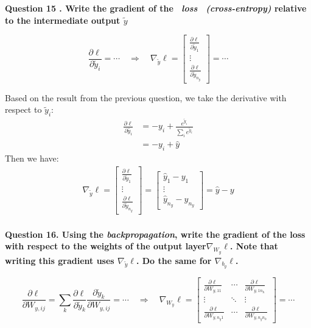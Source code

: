 \documentclass{article}
\begin{document}
\noindent \textbf{Question 15 . Write the gradient of the \ \textit{loss \ (cross-entropy)}  relative to the intermediate output \(\tilde{y}\)}

\[
\frac{\partial \ell}{\partial \tilde{y}_i} = \cdots \quad \Rightarrow \quad \nabla_{\tilde{y}} \ell = \begin{bmatrix} 
\frac{\partial \ell}{\partial \tilde{y}_1} \\
\vdots \\
\frac{\partial \ell}{\partial \tilde{y}_{n_y}} 
\end{bmatrix} = \cdots
\]

Based on the result from the previous question, we take the derivative with respect to \(\tilde{y}_i\):
\begin{align*}
    \frac{\partial \ell}{\partial \tilde{y_i}}
    &= -y_i+\frac{e^{\tilde{y}_i}}{\sum_i e^{\tilde{y}_i}}\\
    &= -y_i+\hat{y}
\end{align*}
Then we have:
\begin{align*}
    \nabla_{\tilde{y}}\ell
 =\begin{bmatrix} 
\frac{\partial \ell}{\partial \tilde{y}_1} \\
\vdots \\
\frac{\partial \ell}{\partial \tilde{y}_{n_y}} 
\end{bmatrix}
=\begin{bmatrix} 
\hat{y}_1-y_1 \\
\vdots \\
\hat{y}_{n_y}-y_{n_y} 
\end{bmatrix}
=\hat{y}-y
\end{align*}\\

\noindent \textbf{Question 16. Using the \textit{backpropagation}, write the gradient of the loss with respect to the weights of the output layer\(\nabla_{W_y} \ell\). Note that writing this gradient uses \(\nabla_{\tilde{y}} \ell\). Do the same for \(\nabla_{b_y} \ell\).}

\[
\frac{\partial \ell}{\partial W_{y,ij}} = \sum_k \frac{\partial \ell}{\partial \tilde{y}_k} \frac{\partial \tilde{y}_k}{\partial W_{y,ij}} = \cdots \quad \Rightarrow \quad \nabla_{W_y} \ell = \begin{bmatrix} 
\frac{\partial \ell}{\partial W_{y,11}} & \cdots & \frac{\partial \ell}{\partial W_{y,1n_h}} \\
\vdots & \ddots & \vdots \\
\frac{\partial \ell}{\partial W_{y,n_y 1}} & \cdots & \frac{\partial \ell}{\partial W_{y,n_y n_h}}
\end{bmatrix} = \cdots
\]
\end{document}
